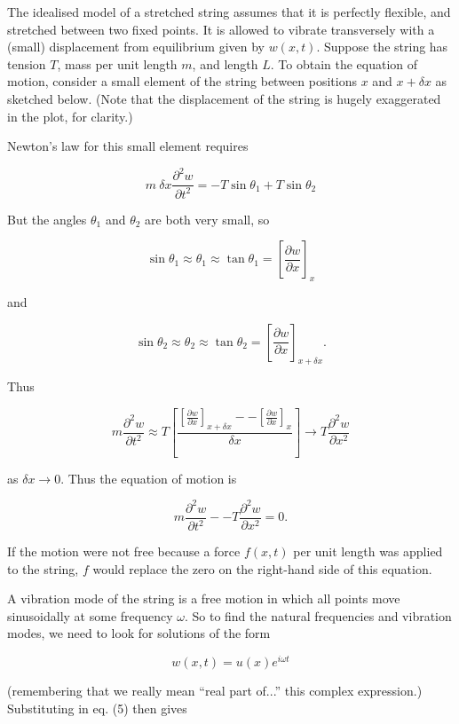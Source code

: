   The idealised model of a stretched string assumes that it is perfectly 
  flexible, and stretched between two fixed points. It is allowed to vibrate 
  transversely with a (small) displacement from equilibrium given by $w(x,t)$. 
  Suppose the string has tension $T$, mass per unit length $m$, and length $L$. 
  To obtain the equation of motion, consider a small element of the string 
  between positions $x$ and $x+ \delta x$ as sketched below. (Note that the 
  displacement of the string is hugely exaggerated in the plot, for clarity.) 

  Newton's law for this small element requires 

  $$m~\delta x \frac{\partial^2 w}{\partial t^2} =-T \sin \theta_1 + T 
  \sin\theta_2 \tag{1}$$ 

  But the angles $\theta_1$ and $\theta_2$ are both very small, so 

  $$\sin \theta_1 \approx \theta_1 \approx \tan \theta_1 = \left[ 
  \frac{\partial w}{\partial x} \right] _x \tag{2}$$ 

  and 

  $$\sin \theta_2 \approx \theta_2 \approx \tan \theta_2 = \left[ 
  \frac{\partial w}{\partial x} \right] _{x + \delta x}. \tag{3}$$ 

  Thus 

  $$m \frac{\partial^2 w}{\partial t^2} \approx T \left[ \dfrac{\left[ 
  \frac{\partial w}{\partial x} \right] _{x + \delta x} -- \left[ 
  \frac{\partial w}{\partial x} \right] _{x} }{\delta x} \right] \rightarrow T 
  \dfrac{\partial^2 w}{\partial x^2} \tag{4}$$ 

  as $\delta x \rightarrow 0$. Thus the equation of motion is 

  $$m \frac{\partial^2 w}{\partial t^2} -- T \dfrac{\partial^2 w}{\partial x^2} 
  =0 . \tag{5}$$ 

  If the motion were not free because a force $f(x,t)$ per unit length was 
  applied to the string, $f$ would replace the zero on the right-hand side of 
  this equation. 

  A vibration mode of the string is a free motion in which all points move 
  sinusoidally at some frequency $\omega$. So to find the natural frequencies 
  and vibration modes, we need to look for solutions of the form 

  $$w(x,t) = u(x) e^{i \omega t} \tag{6}$$ 

  (remembering that we really mean ``real part of...'' this complex 
  expression.) Substituting in eq. (5) then gives 

